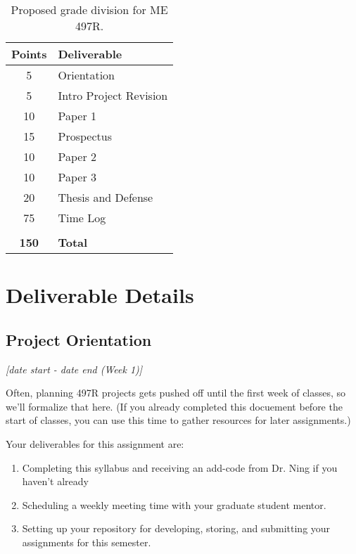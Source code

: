 \documentclass[12pt]{article}
\begin{document}
\begin{table}[h!]
	\caption{Proposed grade division for ME 497R.}
	\label{tab:rubric}
	\renewcommand{\arraystretch}{1.2}
	\vspace{1em}
	\begin{tabular}{c|l}
		\textbf{Points} & \textbf{Deliverable}\\ 
		\hline
		5 & Orientation  \\
		5 & Intro Project Revision \\
		10 & Paper 1 \\
		15 & Prospectus \\
		10 & Paper 2 \\
		10 & Paper 3 \\
		20 & Thesis and Defense \\
		75 & Time Log    \\
		&                \\
		\textbf{150} & \textbf{Total} \\
		
	\end{tabular}
\end{table}





\section{Deliverable Details}
\label{sec:deliverables}


\subsection{Project Orientation}
\label{ssec:orientation}
\textit{[date start - date end (Week 1)]}

\bigskip

Often, planning 497R projects gets pushed off until the first week of classes, so we'll formalize that here. 
(If you already completed this docuement before the start of classes, you can use this time to gather resources for later assignments.)

Your deliverables for this assignment are:
\begin{enumerate}
	\item Completing this syllabus and receiving an add-code from Dr. Ning if you haven't already
	\item Scheduling a weekly meeting time with your graduate student mentor.
	\item Setting up your repository for developing, storing, and submitting your assignments for this semester. 
\end{enumerate}
\end{document}
